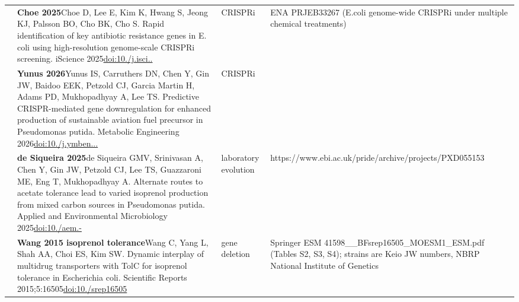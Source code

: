 \begin{landscape}
\begin{longtable}{@{}r@{\hspace{4pt}} L{86mm} L{74mm} L{78mm}@{}}
 & \textbf{Choe 2025}\newline Choe D, Lee E, Kim K, Hwang S, Jeong KJ, Palsson BO, Cho BK, Cho S. Rapid identification of key antibiotic resistance genes in E. coli using high-resolution genome-scale CRISPRi screening. iScience 2025\newline \href{https://doi.org/10.1016/j.isci.2025.112435}{doi:10./\allowbreak j.\allowbreak isci..} & CRISPRi & ENA PRJEB33267 (E.\allowbreak  coli genome-\allowbreak wide CRISPRi under multiple chemical treatments) \\
 & \textbf{Yunus 2026}\newline Yunus IS, Carruthers DN, Chen Y, Gin JW, Baidoo EEK, Petzold CJ, Garcia Martin H, Adams PD, Mukhopadhyay A, Lee TS. Predictive CRISPR-mediated gene downregulation for enhanced production of sustainable aviation fuel precursor in Pseudomonas putida. Metabolic Engineering 2026\newline \href{https://doi.org/10.1016/j.ymben.2025.11.007}{doi:10./\allowbreak j.\allowbreak ymben...} & CRISPRi &  \\
 & \textbf{de Siqueira 2025}\newline de Siqueira GMV, Srinivasan A, Chen Y, Gin JW, Petzold CJ, Lee TS, Guazzaroni ME, Eng T, Mukhopadhyay A. Alternate routes to acetate tolerance lead to varied isoprenol production from mixed carbon sources in Pseudomonas putida. Applied and Environmental Microbiology 2025\newline \href{https://doi.org/10.1128/aem.02123-24}{doi:10./\allowbreak aem.-} & laboratory evolution & https:/\allowbreak /\allowbreak www.\allowbreak ebi.\allowbreak ac.\allowbreak uk/\allowbreak pride/\allowbreak archive/\allowbreak projects/\allowbreak PXD055153 \\
 & \textbf{Wang 2015 isoprenol tolerance}\newline Wang C, Yang L, Shah AA, Choi ES, Kim SW. Dynamic interplay of multidrug transporters with TolC for isoprenol tolerance in Escherichia coli. Scientific Reports 2015;5:16505\newline \href{https://doi.org/10.1038/srep16505}{doi:10./\allowbreak srep16505} & gene deletion & Springer ESM 41598\_\_\allowbreak BFsrep16505\_\allowbreak MOESM1\_\allowbreak ESM.\allowbreak pdf (Tables S2, S3, S4); strains are Keio JW numbers, NBRP National Institute of Genetics \\

\end{longtable}
\end{landscape}

